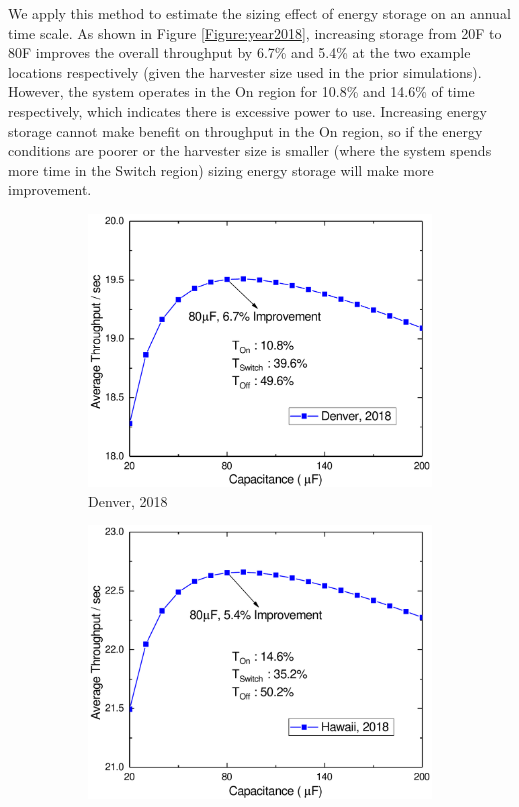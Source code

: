 We apply this method to estimate the sizing effect of energy storage on an annual time scale. As shown in Figure \ref{Figure:year2018}, increasing storage from 20\textmu F to 80\textmu F improves the overall throughput by 6.7\% and 5.4\% at the two example locations respectively (given the harvester size used in the prior simulations). However, the system operates in the On region for 10.8\% and 14.6\% of time respectively, which indicates there is excessive power to use. Increasing energy storage cannot make benefit on throughput in the On region, so if the energy conditions are poorer or the harvester size is smaller (where the system spends more time in the Switch region) sizing energy storage will make more improvement. 

\begin{figure}[H]
    \centering
    \begin{subfigure}{0.49\textwidth}
        \centering
        \includegraphics[width=\textwidth]{figure/work1/denver2018}
        \caption{Denver, 2018}
    \end{subfigure}
    \begin{subfigure}{0.49\textwidth}
        \centering
        \includegraphics[width=\textwidth]{figure/work1/hawaii2018}

\end{subfigure}
\end{figure}
